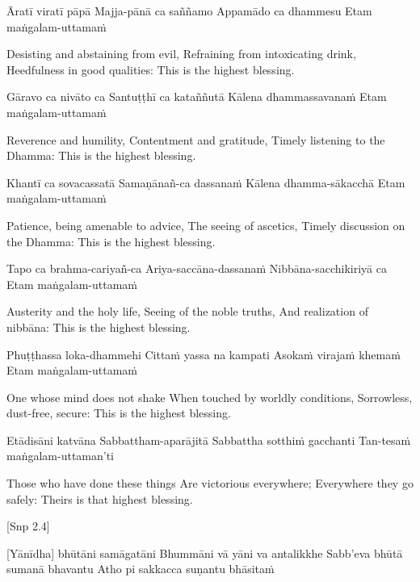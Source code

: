 \begin{english}
\begin{english}
Āratī viratī pāpā
Majja-pānā ca saññamo
Appamādo ca dhammesu
Etam maṅgalam-uttamaṁ

\begin{english}
Desisting and abstaining from evil,
Refraining from intoxicating drink,
Heedfulness in good qualities:
This is the highest blessing.
\end{english}

Gāravo ca nivāto ca
Santuṭṭhī ca kataññutā
Kālena dhammassavanaṁ
Etam maṅgalam-uttamaṁ

\begin{english}
Reverence and humility,
Contentment and gratitude,
Timely listening to the Dhamma:
This is the highest blessing.
\end{english}

Khantī ca sovacassatā
Samaṇānañ-ca dassanaṁ
Kālena dhamma-sākacchā
Etam maṅgalam-uttamaṁ

\begin{english}
Patience, being amenable to advice,
The seeing of ascetics,
Timely discussion on the Dhamma:
This is the highest blessing.
\end{english}

Tapo ca brahma-cariyañ-ca
Ariya-saccāna-dassanaṁ
Nibbāna-sacchikiriyā ca
Etam maṅgalam-uttamaṁ

\begin{english}
Austerity and the holy life,
Seeing of the noble truths,
And realization of nibbāna:
This is the highest blessing.
\end{english}

Phuṭṭhassa loka-dhammehi
Cittaṁ yassa na kampati
Asokaṁ virajaṁ khemaṁ
Etam maṅgalam-uttamaṁ

\begin{english}
One whose mind does not shake
When touched by worldly conditions,
Sorrowless, dust-free, secure:
This is the highest blessing.
\end{english}

Etādisāni katvāna
Sabbattham-aparājitā
Sabbattha sotthiṁ gacchanti
Tan-tesaṁ maṅgalam-uttaman’ti

\begin{english}
Those who have done these things
Are victorious everywhere;
Everywhere they go safely:
Theirs is that highest blessing.
\end{english}
[Snp 2.4]

[Yānīdha] bhūtāni samāgatāni
Bhummāni vā yāni va antalikkhe
Sabb’eva bhūtā sumanā bhavantu
Atho pi sakkacca suṇantu bhāsitaṁ


\end{english}
\end{english}
